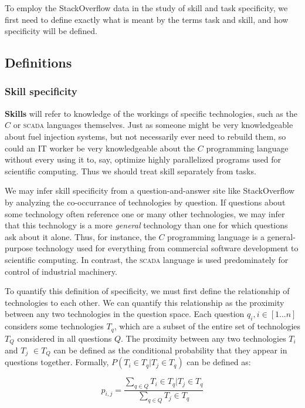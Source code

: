 \documentclass[11pt]{article}
\begin{document}
To employ the StackOverflow data in the study of skill and task
specificity, we first need to define exactly what is meant by the
terms task and skill, and how specificity will be defined. 

\subsection{Definitions}
\label{sec:definitions}

\subsubsection{Skill specificity}
\label{sec:skill-specificity}

\textbf{Skills} will refer to knowledge of the workings of specific
technologies, such as the $C$ or \textsc{scada} languages
themselves. Just as someone might be very knowledgeable about fuel
injection systems, but not necessarily ever need to rebuild them, so
could an IT worker be very knowledgeable about the $C$ programming
language without every using it to, say, optimize highly parallelized
programs used for scientific computing. Thus we should treat skill
separately from tasks. 

We may infer skill specificity from a question-and-answer site
like StackOverflow by analyzing the co-occurrance of technologies by
question. If questions about some technology often reference one or
many other technologies, we may infer that this technology is a more
\textit{general} technology than one for which questions ask about it
alone. Thus, for instance, the $C$ programming language is a
general-purpose technology used for everything from commercial
software development to scientific computing. In contrast, the
\textsc{scada} language is used predominately for control of
industrial machinery. 

To quantify this definition of specificity, we must first define the
relationship of technologies to each other. We can quantify this
relationship as the proximity between any two technologies in the
question space. Each question
$q_i, i \in [1...n]$ considers some technologies $T_q$, which are a subset of the entire set of technologies $T_Q$ considered in all
questions $Q$. The proximity between any two technologies $T_i$ and
$T_j$ $\in T_Q$ can be defined as the conditional
probability that they appear in questions together. Formally, $P(T_i
\in T_q | T_j \in T_q)$ can be defined as:

\begin{equation}
  \label{eq:1}
  p_{i,j} = \frac{\sum_{q \in Q} T_i \in T_q | T_j \in T_q}{\sum_{q \in Q} T_j \in T_q}
\end{equation}
\end{document}
